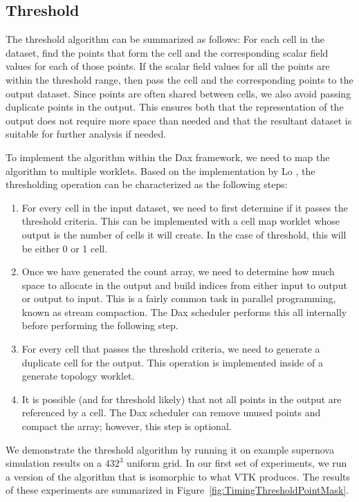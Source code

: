 \subsection{Threshold}

The threshold algorithm can be summarized as follows: For each cell in the
dataset, find the points that form the cell and the corresponding scalar
field values for each of those points. If the scalar field values for all
the points are within the threshold range, then pass the cell and the
corresponding points to the output dataset. Since points are often shared
between cells, we also avoid passing duplicate points in the output. This
ensures both that the representation of the output does not require more
space than needed and that the resultant dataset is suitable for further
analysis if needed.

To implement the algorithm within the Dax framework, we need to map the
algorithm to multiple worklets. Based on the implementation by Lo
\etal{}, the thresholding operation can be characterized as the
following steps:

\begin{enumerate}
\item For every cell in the input dataset, we need to first determine if it
  passes the threshold criteria. This can be implemented with a cell map
  worklet whose output is the number of cells it will create. In the case
  of threshold, this will be either 0 or 1 cell.
\item Once we have generated the count array, we need to determine how much
  space to allocate in the output and build indices from either input to
  output or output to input. This is a fairly common task in parallel
  programming, known as stream compaction. The Dax scheduler performs this
  all internally before performing the following step.
\item For every cell that passes the threshold criteria, we need to
  generate a duplicate cell for the output. This operation is implemented
  inside of a generate topology worklet.
\item It is possible (and for threshold likely) that not all points in the
  output are referenced by a cell. The Dax scheduler can remove unused
  points and compact the array; however, this step is optional.
\end{enumerate}

We demonstrate the threshold algorithm by running it on example supernova
simulation results on a $432^3$ uniform grid. In our first set of
experiments, we run a version of the algorithm that is isomorphic to what
VTK produces. The results of these experiments are summarized in
Figure~\ref{fig:TimingThresholdPointMask}.

